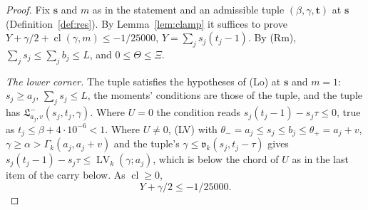 \documentclass[11pt]{article}
\theoremstyle{definition}
\begin{document}
\begin{proof}
Fix $\mathbf s$ and $m$ as in the statement and an admissible tuple $(\beta, \gamma, \mathbf t)$ at $\mathbf s$
(Definition~\ref{def:res}). By Lemma~\ref{lem:clamp} it suffices to prove $Y + \gamma/2 + \operatorname{cl}(\gamma, m)
\le
-1/25000$, $Y = \sum_j s_j(t_j - 1)$. By (Rm), $\sum_j s_j \le \sum_j b_j \le L$, and $0 \le \Theta \le \Xi$.

\emph{The lower corner.} The tuple satisfies the hypotheses of (Lo) at $\mathbf s$ and $m = 1$: $s_j \ge a_j$, $\sum_j
s_j \le L$, the moments' conditions are those of the tuple, and the tuple has $\mathfrak L^-_{a_j, v}(s_j, t_j,
\gamma)$. Where $U = 0$ the condition reads $s_j(t_j - 1) - s_j\tau \le 0$, true as $t_j \le \beta + 4 \cdot 10^{-6}
< 1$. Where $U \ne 0$, (LV) with $\theta_- = a_j \le s_j \le b_j \le \theta_+ = a_j + v$, $\gamma \ge \alpha >
\Gamma_k(a_j, a_j + v)$ and the tuple's $\gamma \le \mathfrak v_k(s_j, t_j - \tau)$ gives $s_j(t_j - 1) - s_j\tau \le
\operatorname{LV}_k(\gamma; a_j)$, which is below the chord of $U$ as in the last item of the carry below. As
$\operatorname{cl} \ge 0$,
\[
  Y + \gamma/2 \le -1/25000. \tag{a}
\]


\end{proof}
\end{document}
